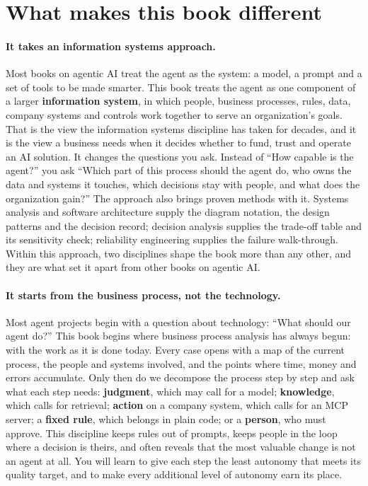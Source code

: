 \section*{What makes this book different}

\paragraph{It takes an information systems approach.} Most books on agentic AI treat the agent as the system: a model, a prompt and a set of tools to be made smarter. This book treats the agent as one component of a larger \textbf{information system}, in which people, business processes, rules, data, company systems and controls work together to serve an organization's goals. That is the view the information systems discipline has taken for decades, and it is the view a business needs when it decides whether to fund, trust and operate an AI solution. It changes the questions you ask. Instead of ``How capable is the agent?'' you ask ``Which part of this process should the agent do, who owns the data and systems it touches, which decisions stay with people, and what does the organization gain?'' The approach also brings proven methods with it. Systems analysis and software architecture supply the diagram notation, the design patterns and the decision record; decision analysis supplies the trade-off table and its sensitivity check; reliability engineering supplies the failure walk-through. Within this approach, two disciplines shape the book more than any other, and they are what set it apart from other books on agentic AI.

\paragraph{It starts from the business process, not the technology.} Most agent projects begin with a question about technology: ``What should our agent do?'' This book begins where business process analysis has always begun: with the work as it is done today. Every case opens with a map of the current process, the people and systems involved, and the points where time, money and errors accumulate. Only then do we decompose the process step by step and ask what each step needs: \textbf{judgment}, which may call for a model; \textbf{knowledge}, which calls for retrieval; \textbf{action} on a company system, which calls for an MCP server; a \textbf{fixed rule}, which belongs in plain code; or a \textbf{person}, who must approve. This discipline keeps rules out of prompts, keeps people in the loop where a decision is theirs, and often reveals that the most valuable change is not an agent at all. You will learn to give each step the least autonomy that meets its quality target, and to make every additional level of autonomy earn its place.


